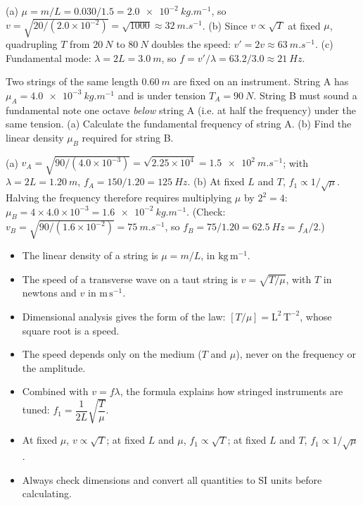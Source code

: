 \documentclass[11pt]{article}
\begin{document}
\begin{corrige}[Exercise 1]
(a) $\mu = m/L = 0.030/1.5 = \SI{2.0e-2}{kg.m^{-1}}$, so $v = \sqrt{20/(2.0\times 10^{-2})} = \sqrt{1000} \approx \SI{32}{m.s^{-1}}$.
(b) Since $v \propto \sqrt{T}$ at fixed $\mu$, quadrupling $T$ from $\SI{20}{N}$ to $\SI{80}{N}$ doubles the speed: $v' = 2v \approx \SI{63}{m.s^{-1}}$.
(c) Fundamental mode: $\lambda = 2L = \SI{3.0}{m}$, so $f = v'/\lambda = 63.2/3.0 \approx \SI{21}{Hz}$.
\end{corrige}

\begin{exercice}
Two strings of the same length $\SI{0.60}{m}$ are fixed on an instrument. String A has $\mu_A = \SI{4.0e-3}{kg.m^{-1}}$ and is under tension $T_A = \SI{90}{N}$. String B must sound a fundamental note one octave \emph{below} string A (i.e. at half the frequency) under the same tension. (a) Calculate the fundamental frequency of string A. (b) Find the linear density $\mu_B$ required for string B.
\end{exercice}

\begin{corrige}[Exercise 2]
(a) $v_A = \sqrt{90/(4.0\times 10^{-3})} = \sqrt{2.25\times 10^{4}} = \SI{1.5e2}{m.s^{-1}}$; with $\lambda = 2L = \SI{1.20}{m}$, $f_A = 150/1.20 = \SI{125}{Hz}$.
(b) At fixed $L$ and $T$, $f_1 \propto 1/\sqrt{\mu}$. Halving the frequency therefore requires multiplying $\mu$ by $2^{2} = 4$: $\mu_B = 4\times 4.0\times 10^{-3} = \SI{1.6e-2}{kg.m^{-1}}$. (Check: $v_B = \sqrt{90/(1.6\times 10^{-2})} = \SI{75}{m.s^{-1}}$, so $f_B = 75/1.20 = \SI{62.5}{Hz} = f_A/2$.)
\end{corrige}

\begin{aretenir}
\begin{itemize}
\item The linear density of a string is $\mu = m/L$, in $\mathrm{kg\,m^{-1}}$.
\item The speed of a transverse wave on a taut string is $v = \sqrt{T/\mu}$, with $T$ in newtons and $v$ in $\mathrm{m\,s^{-1}}$.
\item Dimensional analysis gives the form of the law: $[T/\mu] = \mathrm{L^{2}\,T^{-2}}$, whose square root is a speed.
\item The speed depends only on the medium ($T$ and $\mu$), never on the frequency or the amplitude.
\item Combined with $v = f\lambda$, the formula explains how stringed instruments are tuned: $f_1 = \dfrac{1}{2L}\sqrt{\dfrac{T}{\mu}}$.
\item At fixed $\mu$, $v \propto \sqrt{T}$; at fixed $L$ and $\mu$, $f_1 \propto \sqrt{T}$; at fixed $L$ and $T$, $f_1 \propto 1/\sqrt{\mu}$.
\item Always check dimensions and convert all quantities to SI units before calculating.
\end{itemize}
\end{aretenir}
\end{document}
